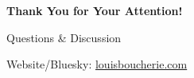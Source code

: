 \documentclass[aspectratio=169,xcolor=dvipsnames,10pt]{beamer}
\begin{document}




\begin{frame}
    \Huge{\centerline{\textbf{Thank You for Your Attention!}}}
    \vspace{1em}
    \Large{\centerline{Questions \& Discussion}}
    \vspace{1em}
    \Large{\centerline{Website/Bluesky: \url{louisboucherie.com}}}
\end{frame}

\end{document}
